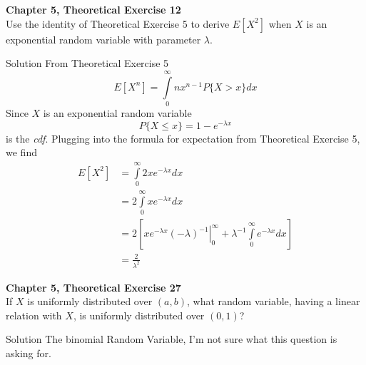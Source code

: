 \documentclass{article}
\begin{document}
\begin{spacing}{1.1}
\newpage
\begin{homeworkProblem}
  {\bf Chapter 5, Theoretical Exercise 12}\\
  Use the identity of Theoretical Exercise 5 to derive $E[ X^2]$ when $X$ 
  is an exponential random variable with parameter $\lambda$.
  \begin{homeworkSection}{Solution}
    From Theoretical Exercise 5
      \[E[ X^n] = \int\limits_{0}^{\infty} n x^{n - 1 } P\{ X > x \} dx\]
    Since $X$ is an exponential random variable 
      \[P\{ X \le x\} = 1 - e^{-\lambda x}\]
    is the \emph{cdf}.  Plugging into the formula for expectation from 
    Theoretical Exercise 5, we find
    \begin{align*}
      E[ X^2] &= \int\limits_{0}^{\infty} 2 x e^{-\lambda x} dx\\
              &= 2 \int\limits_{0}^{\infty} x e^{-\lambda x} dx\\
              &= 2\left[ \left. x e^{-\lambda x} (-\lambda)^{-1} \right|_{0}^{\infty} + \lambda^{-1}\int\limits_0^{\infty} e^{-\lambda x} dx\right] \\
              &= \frac{ 2}{ \lambda^2}
    \end{align*}
    
  \end{homeworkSection}
\end{homeworkProblem}

\newpage
\begin{homeworkProblem}
  {\bf Chapter 5, Theoretical Exercise 27}\\
  If $X$ is uniformly distributed over $(a, b)$, what random variable, 
  having a linear relation with $X$, is uniformly distributed over $(0, 1)$?
  \begin{homeworkSection}{Solution}
    The binomial Random Variable, I'm not sure what this question is asking for. 
    
  \end{homeworkSection}
\end{homeworkProblem}
  
\end{spacing}
\end{document}
